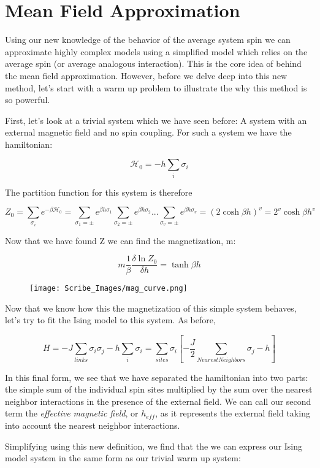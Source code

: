 \documentclass{article}
\newcommand{\pardif}[2]{\frac{\delta#1}{\delta#2}}
\newcommand{\sigi}{\sigma_{i}}
\newcommand{\sigj}{\sigma_{j}}
\begin{document}
\section{Mean Field Approximation}

Using our new knowledge of the behavior of the average system spin we can approximate highly complex models using a simplified model which relies on the average spin (or average analogous interaction).  This is the core idea of behind the mean field approximation.  However, before we delve deep into this new method, let's start with a warm up problem to illustrate the why this method is so powerful.

First, let's look at a trivial system which we have seen before:  A system with an external magnetic field and no spin coupling.  For such a system we have the hamiltonian:

$$\mathcal{H}_{0}=-h\sum_{i}\sigi$$

The partition function for this system is therefore

$$Z_{0}=\sum_{\sigi}e^{-\beta\mathcal{H}_{0}}=\sum_{\sigma_{1}=\pm}e^{\beta h\sigma_{1}}\sum_{\sigma_{2}=\pm}e^{\beta h\sigma_{2}}...\sum_{\sigma_{v}=\pm}e^{\beta h\sigma_{v}}=(2\cosh{\beta h})^{v}=2^{v}\cosh{\beta h}^{v}$$

Now that we have found Z we can find the magnetization, m:

$$m\frac{1}{\beta}\pardif{\ln{Z_{0}}}{h}=\tanh{\beta h}$$

\begin{figure}
	\texttt{[image: Scribe\_Images/mag\_curve.png]}
\end{figure}

Now that we know how this the magnetization of this simple system behaves, let's try to fit the Ising model to this system.  As before,

$$H=-J\sum_{links}\sigi\sigj-h\sum_{i}\sigi=\sum_{sites}\sigi[-\frac{J}{2}\sum_{Nearest Neighbors}\sigj-h]$$

In this final form, we see that we have separated the hamiltonian into two parts: the simple sum of the individual spin sites multiplied by the sum over the nearest neighbor interactions in the presence of the external field.  We can call our second term the \textit{effective magnetic field}, or $h_{eff}$, as it represents the external field taking into account the nearest neighbor interactions.  

Simplifying using this new definition, we find that the we can express our Ising model system in the same form as our trivial warm up system:
\end{document}
